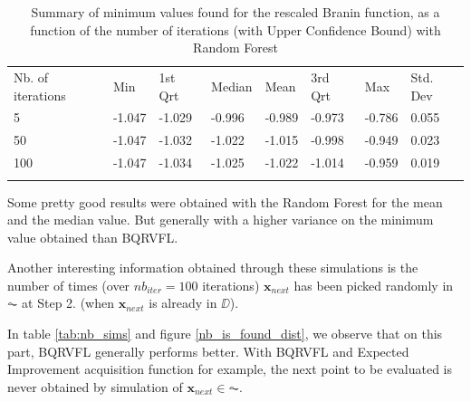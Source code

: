 \begin{table}[!htb]
\begin{center}
\caption{Summary of minimum values found for the rescaled Branin function, as a function of the number of iterations (with Upper Confidence Bound) with Random Forest}
\label{tab:min_values_rf_ucb}       %
\begin{tabular}{llllllll}
\hline\noalign{\smallskip}
Nb. of iterations & Min & 1st Qrt  & Median & Mean  & 3rd Qrt  & Max & Std. Dev \\
\noalign{\smallskip}\hline\noalign{\smallskip}
  5   & -1.047 & -1.029 & -0.996 & -0.989 & -0.973 & -0.786 & 0.055 \\
  50  & -1.047 & -1.032 & -1.022 & -1.015 & -0.998 & -0.949 & 0.023 \\
  100 & -1.047 & -1.034 & -1.025 & -1.022 & -1.014 & -0.959 & 0.019 \\
\noalign{\smallskip}\hline
\end{tabular}
\end{center}
\end{table}

Some pretty good results were obtained with the Random Forest for the mean and the median value. But generally with a higher variance on the minimum value obtained than BQRVFL. 

\medskip

Another interesting information obtained through these simulations is the number of times (over $nb_{iter} = 100$ iterations) $\textbf{x}_{next}$ has been picked randomly in $\AC$ at Step 2. (when $\textbf{x}_{next}$ is already in $\DD$). 

\medskip

In table \ref{tab:nb_sims} and figure \ref{nb_is_found_dist}, we observe that on this part, BQRVFL generally performs better. With BQRVFL and Expected Improvement acquisition function for example, the next point to be evaluated is never obtained by simulation of $\textbf{x}_{next} \in \AC$. 

